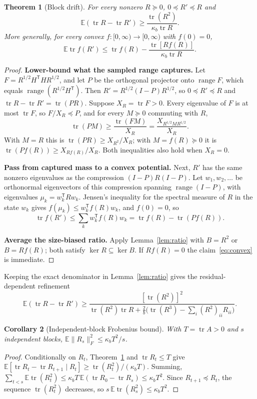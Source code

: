 \documentclass[11pt,a4paper]{article}
\newtheorem{theorem}{Theorem}[section]
\newtheorem{corollary}[theorem]{Corollary}
\theoremstyle{definition}
\theoremstyle{remark}
\newcommand{\E}{\mathbb E}
\newcommand{\tr}{\operatorname{tr}}
\newcommand{\range}{\operatorname{range}}
\newcommand{\norm}[1]{\lVert#1\rVert}
\newcommand{\1}{\mathbf 1}
\newcommand{\T}{\mathsf T}
\newcommand{\proofstep}[1]{\par\medskip\noindent\textbf{#1}\enspace}
\begin{document}
\begin{theorem}[Block drift]\label{thm:block}
For every nonzero $R\succeq0$, $0\preceq R'\preceq R$ and
\[
 \E(\tr R-\tr R')\ge\frac{\tr(R^2)}{\kappa_b\tr R}.
\]
More generally, for every convex $f:[0,\infty)\to[0,\infty)$ with $f(0)=0$,
\begin{equation}\label{eq:convex}
 \E\tr f(R')\le\tr f(R)-\frac{\tr[Rf(R)]}{\kappa_b\tr R}.
\end{equation}
\end{theorem}
\begin{proof}
\proofstep{Lower-bound what the sampled range captures.}
Let $F=R^{1/2}H^\T HR^{1/2}$, and let $P$ be the orthogonal projector
onto $\range F$, which equals $\range(R^{1/2}H^\T)$. Then
$R'=R^{1/2}(I-P)R^{1/2}$, so
$0\preceq R'\preceq R$ and $\tr R-\tr R'=\tr(PR)$. Suppose $X_R=\tr F>0$.
Every eigenvalue of $F$ is at most $\tr F$, so $F/X_R\preceq P$, and for
every $M\succeq0$ commuting with $R$,
\[
 \tr(PM)\ge\frac{\tr(FM)}{X_R}=\frac{X_{R^{1/2}MR^{1/2}}}{X_R}.
\]
With $M=R$ this is $\tr(PR)\ge X_{R^2}/X_R$; with $M=f(R)\succeq0$ it is
$\tr(Pf(R))\ge X_{Rf(R)}/X_R$. Both inequalities also hold when $X_R=0$.
\proofstep{Pass from captured mass to a convex potential.}
Next, $R'$ has the same nonzero eigenvalues as the compression
$(I-P)R(I-P)$. Let $w_1,w_2,\ldots$ be orthonormal eigenvectors of this
compression spanning $\range(I-P)$, with eigenvalues $\mu_k=w_k^\T Rw_k$.
Jensen's inequality for the spectral measure of $R$ in the state $w_k$
gives $f(\mu_k)\le w_k^\T f(R)w_k$, and $f(0)=0$, so
\[
 \tr f(R')\le\sum_kw_k^\T f(R)w_k=\tr f(R)-\tr(Pf(R)).
\]
\proofstep{Average the size-biased ratio.}
Apply Lemma~\ref{lem:ratio} with $B=R^2$ or $B=Rf(R)$; both satisfy
$\ker R\subseteq\ker B$. If $Rf(R)=0$ the claim~\eqref{eq:convex} is
immediate.
\end{proof}

Keeping the exact denominator in Lemma~\ref{lem:ratio} gives the
residual-dependent refinement
\begin{equation}\label{eq:refined-drift}
 \E(\tr R-\tr R')\ge\frac{[\tr(R^2)]^2}
 {\tr(R^2)\tr R+\frac2b\bigl(\tr(R^3)-\sum_i(R^2)_{ii}R_{ii}\bigr)}.
\end{equation}

\begin{corollary}[Independent-block Frobenius bound]\label{cor:blockfrob}
With $T=\tr A>0$ and $s$ independent blocks,
$\E\norm{R_s}_F^2\le\kappa_bT^2/s$.
\end{corollary}
\begin{proof}
Conditionally on $R_t$, Theorem~\ref{thm:block} and $\tr R_t\le T$ give
$\E[\tr R_t-\tr R_{t+1}\mid R_t]\ge\tr(R_t^2)/(\kappa_bT)$. Summing,
$\sum_{t<s}\E\tr(R_t^2)\le\kappa_bT\,\E(\tr R_0-\tr R_s)\le\kappa_bT^2$.
Since $R_{t+1}\preceq R_t$, the sequence $\tr(R_t^2)$ decreases, so
$s\,\E\tr(R_s^2)\le\kappa_bT^2$.
\end{proof}
\end{document}
